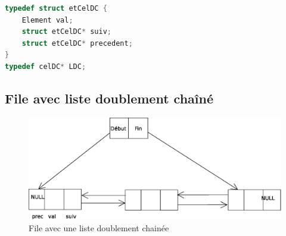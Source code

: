 \begin{lstlisting}[language=C, numbers=none,frame=none]
typedef struct etCelDC {
	Element val;
	struct etCelDC* suiv;
	struct etCelDC* precedent;
}
typedef celDC* LDC;
\end{lstlisting}

\subsection{File avec liste doublement chaîné}
\begin{figure}[H]
	\centering
\includegraphics[width=12cm]{content/fileDoubleChaine.eps}
	\caption{File avec une liste doublement chainée}
\end{figure}
